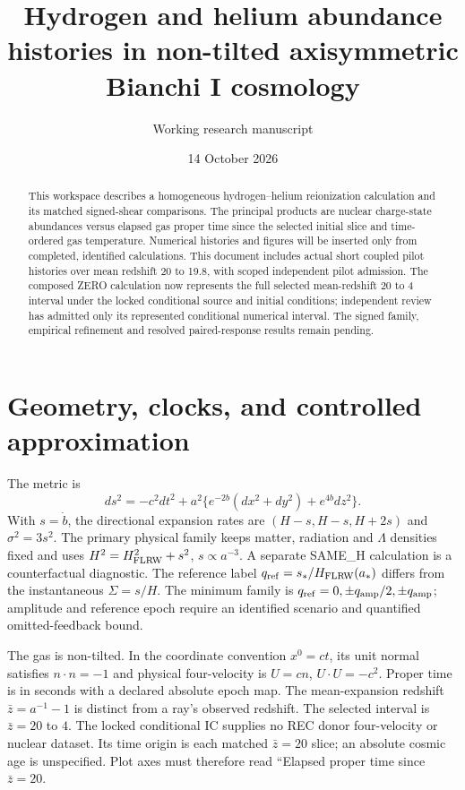 \documentclass[11pt]{article}
\title{Hydrogen and helium abundance histories in non-tilted axisymmetric Bianchi I cosmology}
\author{Working research manuscript}
\date{14 October 2026}
\begin{document}
\maketitle
\begin{abstract}
This workspace describes a homogeneous hydrogen--helium reionization calculation and its matched signed-shear comparisons. The principal products are nuclear charge-state abundances versus elapsed gas proper time since the selected initial slice and time-ordered gas temperature. Numerical histories and figures will be inserted only from completed, identified calculations. This document includes actual short coupled pilot histories over mean redshift 20 to 19.8, with scoped independent pilot admission. The composed ZERO calculation now represents the full selected mean-redshift 20 to 4 interval under the locked conditional source and initial conditions; independent review has admitted only its represented conditional numerical interval. The signed family, empirical refinement and resolved paired-response results remain pending.
\end{abstract}
\section{Geometry, clocks, and controlled approximation}
The metric is
\begin{equation}
 ds^2=-c^2dt^2+a^2\{e^{-2b}(dx^2+dy^2)+e^{4b}dz^2\}.
\end{equation}
With $s=\dot b$, the directional expansion rates are $(H-s,H-s,H+2s)$ and $\sigma^2=3s^2$. The primary physical family keeps matter, radiation and $\Lambda$ densities fixed and uses $H^2=H_{\rm FLRW}^2+s^2$, $s\propto a^{-3}$. A separate SAME\_H calculation is a counterfactual diagnostic. The reference label $q_{\rm ref}=s_*/H_{\rm FLRW}(a_*)$ differs from the instantaneous $\Sigma=s/H$. The minimum family is $q_{\rm ref}=0,\pm q_{\rm amp}/2,\pm q_{\rm amp}$; amplitude and reference epoch require an identified scenario and quantified omitted-feedback bound.

The gas is non-tilted. In the coordinate convention $x^0=ct$, its unit normal satisfies $n\cdot n=-1$ and physical four-velocity is $U=cn$, $U\cdot U=-c^2$. Proper time is in seconds with a declared absolute epoch map. The mean-expansion redshift $\bar z=a^{-1}-1$ is distinct from a ray's observed redshift. The selected interval is $\bar z=20$ to $4$. The locked conditional IC supplies no REC donor four-velocity or nuclear dataset. Its time origin is each matched $\bar z=20$ slice; an absolute cosmic age is unspecified. Plot axes must therefore read ``Elapsed proper time since $\bar z=20$.
\end{document}
